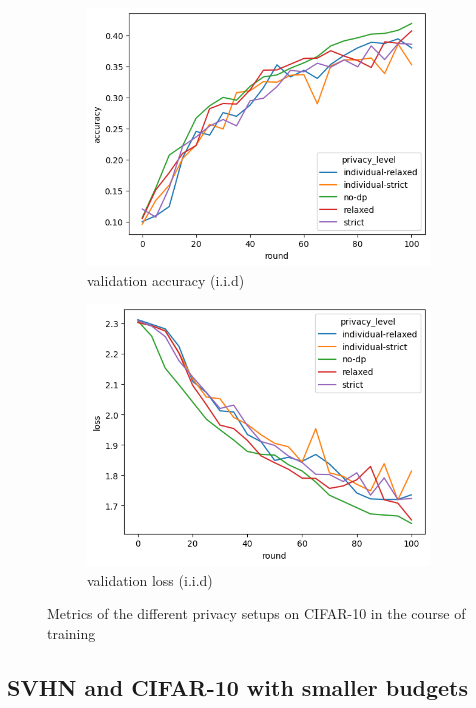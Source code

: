\begin{figure}
\begin{subfigure}{0.4\textwidth}
		\includegraphics[width=\textwidth]{Bilder/cifar10-accuracy-iid.png}
		\caption{validation accuracy (i.i.d)}
	\end{subfigure}
	\begin{subfigure}{0.4\textwidth}
		\centering
		\includegraphics[width=\textwidth]{Bilder/cifar10-loss-iid.png}
		\caption{validation loss (i.i.d)}
	\end{subfigure}
	\caption{Metrics of the different privacy setups on CIFAR-10 in the course of training}
	\label{fig:fed-cifar10-results}
\end{figure}

\subsection{SVHN and CIFAR-10 with smaller budgets}

